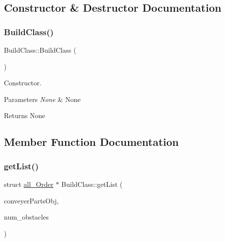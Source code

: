\subsection{Constructor \& Destructor Documentation}
\mbox{\label{classBuildClass_a03e935abdeb4b19d3e233dc6aa70f885}} 
\subsubsection{\texorpdfstring{Build\+Class()}{BuildClass()}}
{\footnotesize\ttfamily Build\+Class\+::\+Build\+Class (\begin{DoxyParamCaption}{ }\end{DoxyParamCaption})\hspace{0.3cm}{\ttfamily [inline]}}



Constructor. 


\begin{DoxyParams}{Parameters}
{\em None} & None \\
\hline
\end{DoxyParams}
\begin{DoxyReturn}{Returns}
None 
\end{DoxyReturn}


\subsection{Member Function Documentation}
\mbox{\label{classBuildClass_afd4c97bb10d023ce4f6a6b15b88171a6}} 
\subsubsection{\texorpdfstring{get\+List()}{getList()}}
{\footnotesize\ttfamily struct \hyperlink{structall__Order}{all\+\_\+\+Order} $\ast$ Build\+Class\+::get\+List (\begin{DoxyParamCaption}\item[{\hyperlink{classConveyerParts}{Conveyer\+Parts} \&}]{conveyer\+Parts\+Obj,  }\item[{int}]{num\+\_\+obstacles }\end{DoxyParamCaption})}



